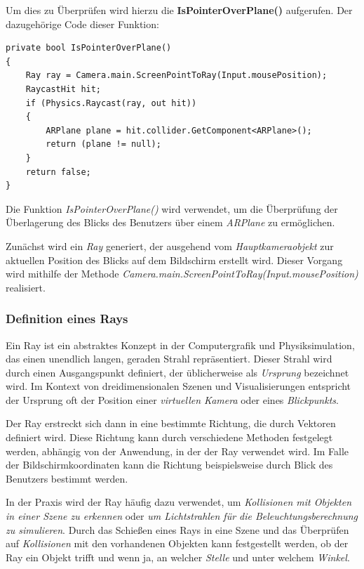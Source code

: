 Um dies zu Überprüfen wird hierzu die \textbf{IsPointerOverPlane()} aufgerufen. Der dazugehörige Code dieser Funktion:
\begin{lstlisting}[style=csharp, caption={Überprüfen ob Benutzer auf ARPlane blickt}, label=code:isPOP]
private bool IsPointerOverPlane()
{
    Ray ray = Camera.main.ScreenPointToRay(Input.mousePosition);
    RaycastHit hit;
    if (Physics.Raycast(ray, out hit))
    {
        ARPlane plane = hit.collider.GetComponent<ARPlane>();
        return (plane != null);
    }
    return false;
}
\end{lstlisting}
Die Funktion \textit{IsPointerOverPlane()} wird verwendet, um die Überprüfung der Überlagerung des Blicks des Benutzers
über einem \textit{ARPlane} zu ermöglichen.

Zunächst wird ein \textit{Ray} generiert, der ausgehend vom \textit{Hauptkameraobjekt} zur aktuellen Position des Blicks
auf dem Bildschirm erstellt wird. Dieser Vorgang wird mithilfe der Methode \textit{Camera.main.ScreenPointToRay(Input.mousePosition)}
realisiert.

\subsubsection*{Definition eines Rays} %
Ein Ray ist ein abstraktes Konzept in der Computergrafik und Physiksimulation, das einen unendlich langen, geraden Strahl
repräsentiert. Dieser Strahl wird durch einen Ausgangspunkt definiert, der üblicherweise als \textit{Ursprung} bezeichnet
wird. Im Kontext von dreidimensionalen Szenen und Visualisierungen entspricht der Ursprung oft der Position einer
\textit{virtuellen Kamera} oder eines \textit{Blickpunkts}.

Der Ray erstreckt sich dann in eine bestimmte Richtung, die durch Vektoren definiert wird. Diese Richtung kann durch
verschiedene Methoden festgelegt werden, abhängig von der Anwendung, in der der Ray verwendet wird. Im Falle der
Bildschirmkoordinaten kann die Richtung beispielsweise durch  Blick des Benutzers bestimmt werden.

In der Praxis wird der Ray häufig dazu verwendet, um \textit{Kollisionen mit Objekten in einer Szene zu erkennen} oder
\textit{um Lichtstrahlen für die Beleuchtungsberechnung zu simulieren}. Durch das Schießen eines Rays in eine Szene und
das Überprüfen auf \textit{Kollisionen} mit den vorhandenen Objekten kann festgestellt werden, ob der Ray ein Objekt
trifft und wenn ja, an welcher \textit{Stelle} und unter welchem \textit{Winkel}.\\

